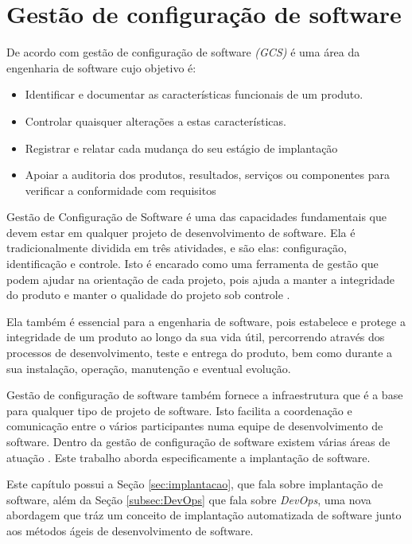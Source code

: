 \chapter{Gestão de configuração de software}
\label{cap-referencial}

De acordo com  gestão de configuração de software \textit{(GCS)} 
é uma área da engenharia de software cujo objetivo é:

\begin{itemize}
  \item Identificar e documentar as características funcionais de
  um produto.
  \item Controlar quaisquer alterações a estas características.
  \item Registrar e relatar cada mudança do seu estágio de implantação
  \item Apoiar a auditoria dos produtos, resultados, serviços ou
componentes para verificar a conformidade com requisitos

\end{itemize}

Gestão de Configuração de Software é uma das capacidades fundamentais que devem
estar em qualquer projeto de desenvolvimento de software. Ela é
tradicionalmente dividida em três atividades, e são elas: configuração,
identificação e controle. Isto é encarado como uma ferramenta de
gestão que podem ajudar na orientação de cada projeto, pois ajuda a manter a
integridade do produto e manter o qualidade do projeto sob controle \cite{gcs}. 

Ela também é essencial para a engenharia de software, pois estabelece e protege a
integridade de um produto ao longo da sua vida útil, percorrendo através dos
processos de desenvolvimento, teste e entrega do produto, bem como
durante a sua instalação, operação, manutenção e eventual evolução\cite{ieegcs}.

Gestão de configuração de software também fornece a infraestrutura que é a base para
qualquer tipo de projeto de software. Isto facilita a coordenação e comunicação
entre o vários participantes numa equipe de desenvolvimento de software.
Dentro da gestão de configuração de software
existem várias áreas de atuação \cite{gcs}. Este trabalho aborda especificamente a 
implantação de software.

Este capítulo possui a Seção \ref{sec:implantacao}, que fala sobre
implantação de software, além da Seção \ref{subsec:DevOps} que fala sobre 
\textit{DevOps}, uma
nova abordagem que tráz um conceito de implantação
automatizada de software junto aos métodos ágeis de desenvolvimento de software. 

